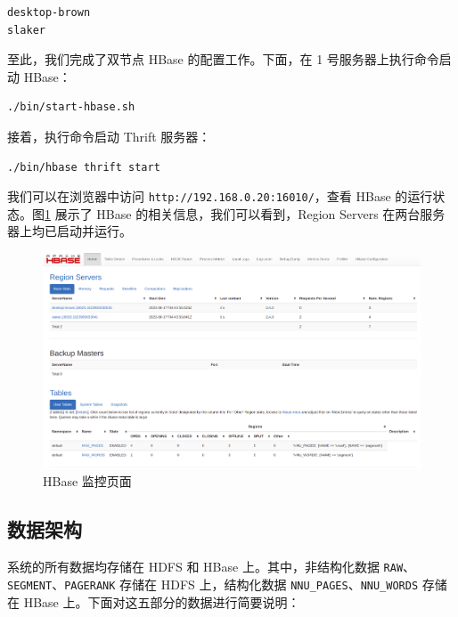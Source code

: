 \documentclass{ctexart}
\newcommand{\code}[1]{\colorbox{backcolor}{\lstinline|#1|}}
\begin{document}
    \begin{lstlisting}[language=bash]
desktop-brown
slaker
    \end{lstlisting}

    至此，我们完成了双节点 HBase 的配置工作。下面，在 1 号服务器上执行命令启动 HBase：

    \begin{lstlisting}[language=bash]
./bin/start-hbase.sh
    \end{lstlisting}

    接着，执行命令启动 Thrift 服务器：

    \begin{lstlisting}[language=bash]
./bin/hbase thrift start
    \end{lstlisting}

    我们可以在浏览器中访问 \code{http://192.168.0.20:16010/}，查看 HBase 的运行状态。图\ref{fig:archicture_hbase-web} 展示了 HBase 的相关信息，我们可以看到，Region Servers 在两台服务器上均已启动并运行。

    \begin{figure}[t]
        \centering
        \includegraphics[width=\textwidth]{src/archicture_hbase-web}
        \caption{HBase 监控页面}
        \label{fig:archicture_hbase-web}
    \end{figure}

    \subsection{数据架构}\label{subsec:archicture_data}

    系统的所有数据均存储在 HDFS 和 HBase 上。其中，非结构化数据 \code{RAW}、\code{SEGMENT}、\code{PAGERANK} 存储在 HDFS 上，结构化数据 \code{NNU_PAGES}、\code{NNU_WORDS} 存储在 HBase 上。下面对这五部分的数据进行简要说明：
\end{document}
